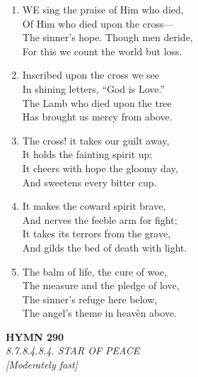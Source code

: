 \documentclass[11pt,a4paper]{article}
\begin{document}
\begin{enumerate}
    \item WE sing the praise of Him who died, \\
        Of Him who died upon the cross--- \\
        The sinner's hope. Though men deride, \\
        For this we count the world but loss.

    \item Inscribed upon the cross we see \\
        In shining letters, ``God is Love.'' \\
        The Lamb who died upon the tree \\
        Has brought us mercy from above.

    \item The cross! it takes our guilt away, \\
        It holds the fainting spirit up; \\
        It cheers with hope the gloomy day, \\
        And sweetens every bitter cup.

    \item It makes the coward spirit brave, \\
        And nerves the feeble arm for fight; \\
        It takes its terrors from the grave, \\
        And gilds the bed of death with light.

    \item The balm of life, the cure of woe, \\
        The measure and the pledge of love, \\
        The sinner's refuge here below, \\
        The angel's theme in heav\`en above.

\end{enumerate}

\newpage
\begin{center}
    {\Large \textbf{HYMN 290}}
    \\
    \textit{8.7.8.4.8.4. STAR OF PEACE}
    \\
    \textit{\small [Moderately fast]}
\end{center}
\vspace{1em}
\end{document}
